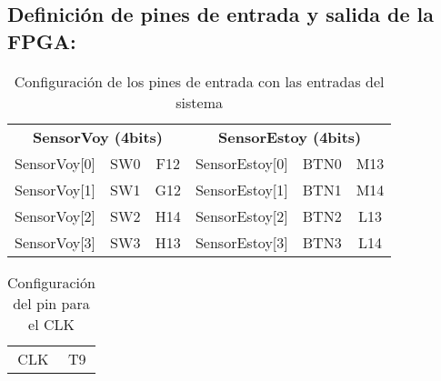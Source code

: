 \subsection{Definición de pines de entrada y salida de la FPGA:}
	\begin{table}[H]
    \centering
		\begin{tabular}{|c|c|c||c|c|c|}
			\hline
			\rowcolor[rgb]{0.21,0.69,0.87}\multicolumn{6}{|c|}{  \textbf{ {Configuración Pines de entrada}}} \\
			\hline \hline
			\multicolumn{3}{|c|}{  \textbf{ {SensorVoy (4bits)}}} & \multicolumn{3}{|c|}{\textbf{SensorEstoy (4bits)}} \\
			\hline
			SensorVoy[0] & SW0 & F12 & SensorEstoy[0] & BTN0 & M13 \\
			\hline
			SensorVoy[1] & SW1 & G12 & SensorEstoy[1] & BTN1 & M14 \\
			\hline
			SensorVoy[2] & SW2 & H14 & SensorEstoy[2] & BTN2 & L13 \\
			\hline
			SensorVoy[3] & SW3 & H13 & SensorEstoy[3] & BTN3 & L14 \\
			\hline
		\end{tabular}
		\caption{ Configuración de los pines de entrada con las entradas del sistema }
		\label{tab:pinEntradas}
	\end{table}

	\begin{table}[H]
    \centering
		\begin{tabular}{|c|c|}
			\hline
			\rowcolor[rgb]{0.21,0.69,0.87}\multicolumn{2}{|c|}{  \textbf{ {Configuración pin CLK}}} \\
			\hline \hline
			CLK & T9 \\ 
			\hline
		\end{tabular}
		\caption{ Configuración del pin para el CLK }
		\label{tab:pinCLK}
	\end{table}

